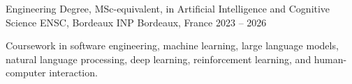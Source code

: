 
\begin{cventries}
  \cventry
    {Engineering Degree, MSc-equivalent, in Artificial Intelligence and Cognitive Science}
    {ENSC, Bordeaux INP}
    {Bordeaux, France}
    {2023 -- 2026}
    {
      \begin{cvitems}
        \item {Coursework in software engineering, machine learning, large language models, natural language processing, deep learning, reinforcement learning, and human-computer interaction.}
      \end{cvitems}
    }
\end{cventries}
